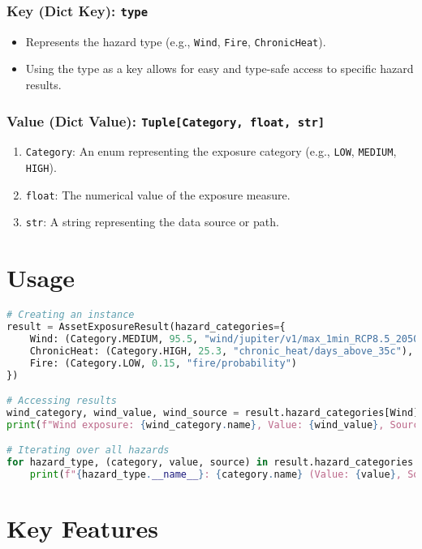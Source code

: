 \documentclass{article}
\begin{document}
\subsubsection{Key (Dict Key): \texttt{type}}
\begin{itemize}
    \item Represents the hazard type (e.g., \texttt{Wind}, \texttt{Fire}, \texttt{ChronicHeat}).
    \item Using the type as a key allows for easy and type-safe access to specific hazard results.
\end{itemize}

\subsubsection{Value (Dict Value): \texttt{Tuple[Category, float, str]}}
\begin{enumerate}
    \item \texttt{Category}: An enum representing the exposure category (e.g., \texttt{LOW}, \texttt{MEDIUM}, \texttt{HIGH}).
    \item \texttt{float}: The numerical value of the exposure measure.
    \item \texttt{str}: A string representing the data source or path.
\end{enumerate}

\section{Usage}

\begin{lstlisting}[language=Python]
# Creating an instance
result = AssetExposureResult(hazard_categories={
    Wind: (Category.MEDIUM, 95.5, "wind/jupiter/v1/max_1min_RCP8.5_2050"),
    ChronicHeat: (Category.HIGH, 25.3, "chronic_heat/days_above_35c"),
    Fire: (Category.LOW, 0.15, "fire/probability")
})

# Accessing results
wind_category, wind_value, wind_source = result.hazard_categories[Wind]
print(f"Wind exposure: {wind_category.name}, Value: {wind_value}, Source: {wind_source}")

# Iterating over all hazards
for hazard_type, (category, value, source) in result.hazard_categories.items():
    print(f"{hazard_type.__name__}: {category.name} (Value: {value}, Source: {source})")
\end{lstlisting}

\section{Key Features}
\end{document}

